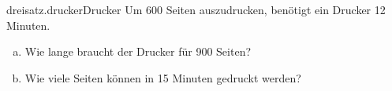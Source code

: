 \begin{exercise}{dreisatz.drucker}{Drucker}
  \ifproblem\problem
    Um 600 Seiten auszudrucken, benötigt ein Drucker 12 Minuten.
    \begin{enumerate}[a)]
      \item Wie lange braucht der Drucker für 900 Seiten?
      \item Wie viele Seiten können in 15 Minuten gedruckt werden?
    \end{enumerate}
  \fi
\end{exercise}
